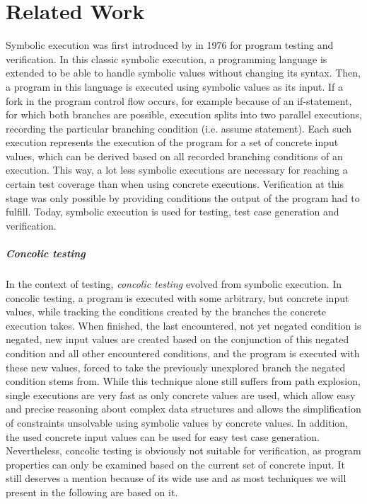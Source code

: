 \chapter{Related Work}
\label{sec:relatedWork}
Symbolic execution was first introduced by \cite{King1976} in 1976 for program testing and verification.
In this classic symbolic execution, a programming language is extended to be able to handle symbolic values without changing its syntax.
Then, a program in this language is executed using symbolic values as its input.
If a fork in the program control flow occurs, for example because of an if-statement, for which both branches are possible, execution splits into two parallel executions,
recording the particular branching condition (i.e. assume statement).
Each such execution represents the execution of the program for a set of concrete input values, which can be derived based on all recorded branching conditions of an execution.
This way, a lot less symbolic executions are necessary for reaching a certain test coverage than when using concrete executions.
Verification at this stage was only possible by providing conditions the output of the program had to fulfill.
Today, symbolic execution is used for testing, test case generation and verification.

\paragraph*{Concolic testing}
In the context of testing, \emph{concolic testing} \cite{Sen2005} \cite{Godefroid2005} \cite{Majumdar2007} evolved from symbolic execution.
In concolic testing, a program is executed with some arbitrary, but concrete input values, while tracking the conditions created by the branches the concrete execution takes.
When finished, the last encountered, not yet negated condition is negated, new input values are created based on the conjunction of this negated condition and all other encountered conditions, and
the program is executed with these new values, forced to take the previously unexplored branch the negated condition stems from.
While this technique alone still suffers from path explosion, single executions are very fast as only concrete values are used, which allow easy and precise reasoning about complex data structures \cite{Burnim2008} and allows the simplification of constraints unsolvable using symbolic values by concrete values.
In addition, the used concrete input values can be used for easy test case generation.
Nevertheless, concolic testing is obviously not suitable for verification, as program properties can only be examined based on the current set of concrete input.
It still deserves a mention because of its wide use and as most techniques we will present in the following are based on it.

